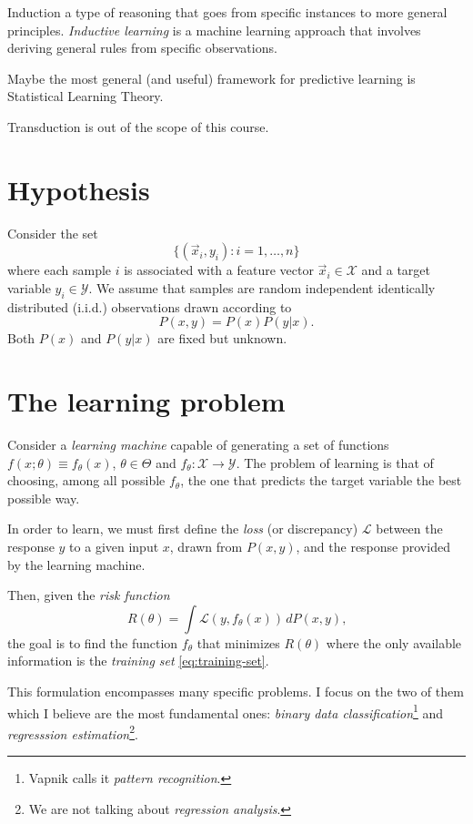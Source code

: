 Induction a type of reasoning that goes from specific instances to more general
principles. \emph{Inductive learning} is a machine learning approach that involves deriving
general rules from specific observations.

Maybe the most general (and useful) framework for predictive learning is Statistical
Learning Theory.

Transduction is out of the scope of this course.

\section{Hypothesis}

Consider the set
\begin{equation}
  \label{eq:training-set}
  \big\{(\vec{x}_i, y_i) : i = 1, \dots, n \big\}
\end{equation}
where each sample $i$ is associated with a feature vector $\vec{x}_i \in \mathcal{X}$ and a target variable
$y_i \in \mathcal{Y}$.  We assume that samples are random independent identically
distributed (i.i.d.) observations drawn according to $$P(x, y) = P(x) P(y | x)\text{.}$$
Both $P(x)$ and $P(y|x)$ are fixed but unknown.

\section{The learning problem}

Consider a \emph{learning machine} capable of generating a set of functions $f(x;
\theta) \equiv f_\theta(x)$, $\theta \in \Theta$ and $f_\theta : \mathcal{X} \rightarrow \mathcal{Y}$.
The problem of learning is that of choosing, among all possible $f_\theta$, the one that
predicts the target variable the best possible way.

In order to learn, we must first define the \emph{loss} (or discrepancy) $\mathcal{L}$
between the response $y$ to a given input $x$, drawn from $P(x, y)$, and the
response provided by the learning machine.

Then, given the \emph{risk function}
\begin{equation}
  \label{eq:risk}
  R(\theta) = \int \mathcal{L}(y, f_\theta(x))\, dP(x, y)\text{,}
\end{equation}
the goal is to find the function $f_\theta$ that minimizes $R(\theta)$
where the only available information is the \emph{training set} \eqref{eq:training-set}.

This formulation encompasses many specific problems. I focus on the two of them which I
believe are the most fundamental ones: \emph{binary data classification}\footnote{Vapnik
calls it \emph{pattern recognition}.} and \emph{regresssion estimation}\footnote{We are not talking about
\emph{regression analysis}.}.

